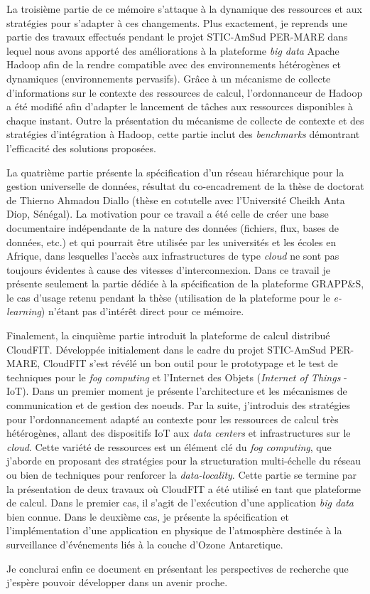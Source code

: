 La troisième partie de ce mémoire s'attaque à la dynamique des ressources et aux stratégies pour s'adapter à ces changements. Plus exactement, je reprends une partie des travaux effectués pendant le projet STIC-AmSud PER-MARE dans lequel nous avons apporté des améliorations à la plateforme \textit{big data} Apache Hadoop afin de la rendre compatible avec des environnements hétérogènes et dynamiques (environnements pervasifs). Grâce à un mécanisme de collecte d'informations sur le contexte des ressources de calcul, l'ordonnanceur de Hadoop a été modifié  afin d'adapter le lancement de tâches aux ressources disponibles à chaque instant. Outre la présentation du mécanisme de collecte de contexte et des stratégies d'intégration à Hadoop, cette partie inclut des \textit{benchmarks} démontrant l'efficacité des solutions proposées. 

La quatrième partie présente la spécification d'un réseau hiérarchique pour la gestion universelle de données, résultat du co-encadrement de la thèse de doctorat de Thierno Ahmadou Diallo (thèse en cotutelle avec l'Université Cheikh Anta Diop, Sénégal). La motivation pour ce travail a été celle de créer une base documentaire indépendante de la nature des données (fichiers, flux, bases de données, etc.) et qui pourrait être utilisée par les universités et les écoles en Afrique, dans lesquelles l'accès aux infrastructures de type \textit{cloud} ne sont pas toujours évidentes à cause des vitesses d'interconnexion. Dans ce travail je présente seulement la partie dédiée à la spécification de la plateforme GRAPP\&S, le cas d'usage retenu pendant la thèse (utilisation de la plateforme pour le \textit{e-learning}) n'étant pas d'intérêt direct pour ce mémoire. 

Finalement, la cinquième partie introduit la plateforme de calcul distribué CloudFIT. Développée initialement dans le cadre du projet STIC-AmSud PER-MARE, CloudFIT s'est révélé un bon outil pour le prototypage et le test de techniques pour le \textit{fog computing} et l'Internet des Objets (\textit{Internet of Things} - IoT). Dans un premier moment je présente l'architecture et les mécanismes de communication et de gestion des n{oe}uds. Par la suite, j'introduis des stratégies pour l'ordonnancement adapté au contexte pour les ressources de calcul très hétérogènes, allant des dispositifs IoT aux \textit{data centers} et infrastructures sur le \textit{cloud}. Cette variété de ressources est un élément clé du \textit{fog computing}, que j'aborde en proposant des stratégies pour la structuration multi-échelle du réseau ou bien de techniques pour renforcer la \textit{data-locality}. Cette partie se termine par la présentation de deux travaux où CloudFIT a été utilisé en tant que plateforme de calcul. Dans le premier cas, il s'agit de l'exécution d'une application \textit{big data} bien connue. Dans le deuxième cas, je présente la spécification et l'implémentation d'une application en physique de l'atmosphère destinée à la surveillance d'événements liés à la couche d'Ozone Antarctique. 

Je conclurai enfin ce document en présentant les perspectives de recherche que j'espère pouvoir développer dans un avenir proche.


 

